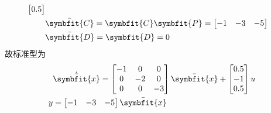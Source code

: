 \begin{exercise}
\begin{enumerate}
\begin{align*}
\begin{bmatrix}
                0.5
            \end{bmatrix} \\
            &\bar{\symbfit{C}} = \symbfit{C}\symbfit{P} = \begin{bmatrix}
                -1 & -3 & -5
            \end{bmatrix} \\
            &\bar{\symbfit{D}} = \symbfit{D} = 0
        \end{align*}
        故标准型为
        \begin{align*}
            &\dot{\bar{\symbfit{x}}} = \begin{bmatrix}
                -1 & 0 & 0 \\
                0 & -2 & 0 \\
                0 & 0 & -3
            \end{bmatrix} \bar{\symbfit{x}} + \begin{bmatrix}
                0.5 \\
                -1 \\
                0.5
            \end{bmatrix} u \\
            y &= \begin{bmatrix}
                -1 & -3 & -5
            \end{bmatrix} \bar{\symbfit{x}}
        \end{align*}
    \end{enumerate}
\end{exercise}

